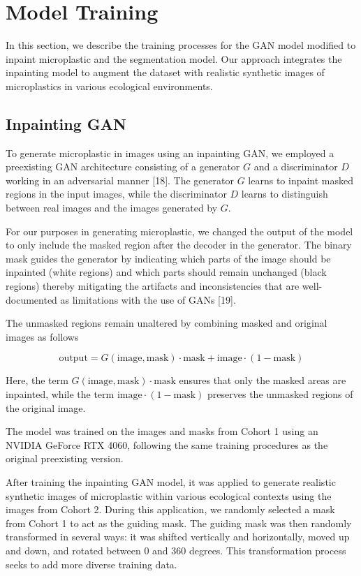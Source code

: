 \documentclass{article}
\begin{document}
\section{Model Training}

In this section, we describe the training processes for the GAN model modified to inpaint microplastic and the segmentation model. Our approach integrates the inpainting model to augment the dataset with realistic synthetic images of microplastics in various ecological environments.

\subsection{Inpainting GAN}

To generate microplastic in images using an inpainting GAN, we employed a preexisting GAN architecture consisting of a generator \( G \) and a discriminator \( D \) working in an adversarial manner [18]. The generator \( G \) learns to inpaint masked regions in the input images, while the discriminator \( D \) learns to distinguish between real images and the images generated by \( G \).

For our purposes in generating microplastic, we changed the output of the model to only include the masked region after the decoder in the generator. The binary mask guides the generator by indicating which parts of the image should be inpainted (white regions) and which parts should remain unchanged (black regions) thereby mitigating the artifacts and inconsistencies that are well-documented as limitations with the use of GANs [19].

The unmasked regions remain unaltered by combining masked and original images as follows

\begin{equation}
\text{output} = G(\text{image}, \text{mask}) \cdot \text{mask} + \text{image} \cdot (1 - \text{mask})
\end{equation}

Here, the term \( G(\text{image}, \text{mask}) \cdot \text{mask} \) ensures that only the masked areas are inpainted, while the term \( \text{image} \cdot (1 - \text{mask}) \) preserves the unmasked regions of the original image.

The model was trained on the images and masks from Cohort 1 using an NVIDIA GeForce RTX 4060, following the same training procedures as the original preexisting version.

After training the inpainting GAN model, it was applied to generate realistic synthetic images of microplastic within various ecological contexts using the images from Cohort 2. During this application, we randomly selected a mask from Cohort 1 to act as the guiding mask. The guiding mask was then randomly transformed in several ways: it was shifted vertically and horizontally, moved up and down, and rotated between 0 and 360 degrees. This transformation process seeks to add more diverse training data.
\end{document}

